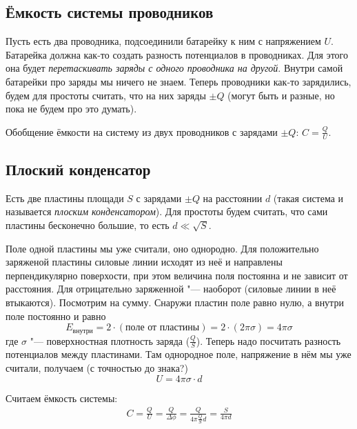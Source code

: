   \subsection{Ёмкость системы проводников}
    Пусть есть два проводника, подсоединили батарейку к ним с напряжением $U$.
    Батарейка должна как-то создать разность потенциалов в проводниках.
    Для этого она будет \textit{перетаскивать заряды с одного проводника на другой}.
    Внутри самой батарейки про заряды мы ничего не знаем.
    Теперь проводники как-то зарядились, будем для простоты считать, что на них заряды $\pm Q$
    (могут быть и разные, но пока не будем про это думать).
    \begin{Def}
      Обобщение ёмкости на систему из двух проводников с зарядами $\pm Q$:
      $C=\frac QU$.
    \end{Def}

  \subsection{Плоский конденсатор}
    Есть две пластины площади $S$ с зарядами $\pm Q$ на расстоянии $d$
    (такая система и называется \textit{плоским конденсатором}).
    Для простоты будем считать, что сами пластины бесконечно большие, то есть $d \ll \sqrt S$.

    Поле одной пластины мы уже считали, оно однородно.
    Для положительно заряженой пластины силовые линии исходят из неё и направлены перпендикулярно поверхости,
    при этом величина поля постоянна и не зависит от расстояния.
    Для отрицательно заряженной "--- наоборот (силовые линии в неё втыкаются).
    Посмотрим на сумму.
    Снаружи пластин поле равно нулю, а внутри поле постоянно и равно
    \[E_{\text{внутри}} = 2\cdot(\text{поле от пластины}) = 2\cdot(2\pi \sigma) = 4\pi\sigma\]
    где $\sigma$ "--- поверхностная плотность заряда ($\frac Q S$).
    Теперь надо посчитать разность потенциалов между пластинами.
    Там однородное поле, напряжение в нём мы уже считали, получаем (с точностью до знака?)
    \[U = 4\pi\sigma \cdot d\]

    Считаем ёмкость системы:
    \begin{gather*}
    C = \frac Q U = \frac Q {\Delta \phi} = \frac Q {4 \pi \frac{Q}{S} d} = \frac{S}{4\pi d}
    \end{gather*}

